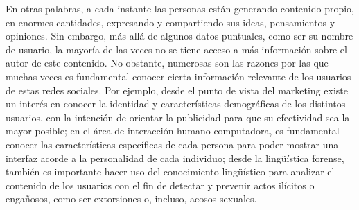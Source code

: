 En otras palabras, a cada instante las personas están generando contenido propio, en enormes cantidades, expresando y compartiendo sus ideas, pensamientos y opiniones. Sin embargo, más allá de algunos datos puntuales, como ser su nombre de usuario, la mayoría de las veces no se tiene acceso a más información sobre el autor de este contenido.
No obstante, numerosas son las razones por las que muchas veces es fundamental conocer cierta información relevante de los usuarios de estas redes sociales.
Por ejemplo, desde el punto de vista del marketing existe un interés en conocer la identidad y características demográficas de los distintos usuarios, con la intención de orientar la publicidad para que su efectividad sea la mayor posible\cite{bentolila2011system};
en el área de interacción humano-computadora, es fundamental conocer las características específicas de cada persona para poder mostrar una interfaz acorde a la personalidad de cada individuo\cite{andres2015towards};
desde la lingüística forense\cite{aronoff2017handbook}, también es importante hacer uso del conocimiento lingüístico para analizar el contenido de los usuarios con el fin de detectar y prevenir  actos ilícitos o engañosos, como ser extorsiones o, incluso, acosos sexuales\cite{hall2007profile, escalante2015early}.

